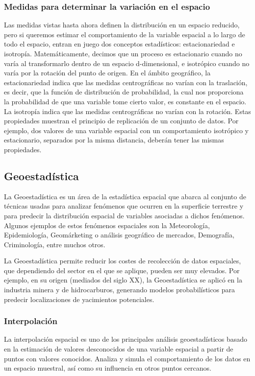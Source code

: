 \subsubsection{Medidas para determinar la variación en el espacio}
Las medidas vistas hasta ahora definen la distribución en un espacio reducido, 
pero si queremos estimar el comportamiento de la variable espacial a lo largo de todo el espacio, 
entran en juego dos conceptos estadísticos: estacionariedad e isotropía.
Matemáticamente, decimos que un proceso es estacionario cuando no varía al transformarlo dentro de un espacio d-dimensional, e isotrópico cuando no varía por la rotación del punto de origen.
En el ámbito geográfico, la estacionariedad indica que las medidas centrográficas no varían con la traslación, es decir, 
que la función de distribución de probabilidad, la cual nos proporciona la probabilidad de que una variable tome cierto valor, es constante en el espacio.
La isotropía indica que las medidas centrográficas no varían con la rotación. 
Estas propiedades muestran el principio de replicación de un conjunto de datos. 
Por ejemplo, dos valores de una variable espacial con un comportamiento isotrópico y estacionario, separados por la misma distancia, deberán tener las mismas propiedades.

\subsection{Geoestadística}
La Geoestadística es un área de la estadística espacial que abarca al conjunto de técnicas usadas para analizar fenómenos que ocurren en la superficie terrestre y 
para predecir la distribución espacial de variables asociadas a dichos fenómenos.
Algunos ejemplos de estos fenómenos espaciales son la Meteorología, Epidemiología, Geomárketing o análisis geográfico de mercados, Demografía, Criminología, entre muchos otros.

La Geoestadística permite reducir los costes de recolección de datos espaciales, que dependiendo del sector en el que se aplique, pueden ser muy elevados.
Por ejemplo, en su origen (mediados del siglo XX), la Geoestadística se aplicó en la industria minera y de hidrocarburos,
generando modelos probabilísticos para predecir localizaciones de yacimientos potenciales.

\subsubsection{Interpolación}
La interpolación espacial es uno de los principales análisis geoestadísticos basado en la estimación de valores desconocidos de una variable espacial a partir de puntos con valores conocidos. 
Analiza y simula el comportamiento de los datos en un espacio muestral, así como su influencia en otros puntos cercanos.

